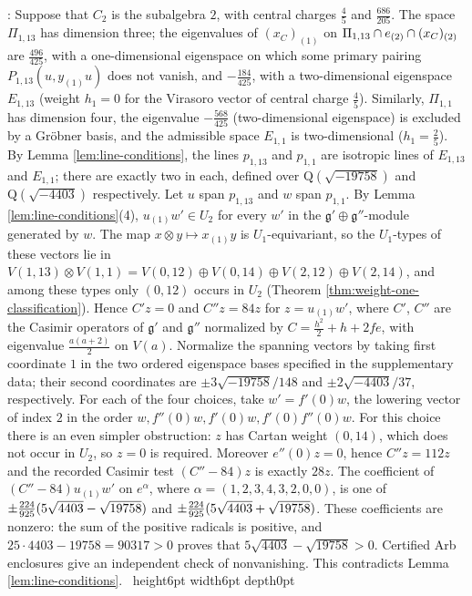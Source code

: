 \documentclass[leqno]{article}
\newcommand{\Q}{\mathrm{Q}}
\newcommand{\qed}{\hfill \vrule height6pt  width6pt depth0pt}
\newcommand{\ot}{\otimes}
\let\i\relax
\newcommand{\i}{\mathrm{i}}
\let\ker\relax
\DeclareMathOperator{\ker}{Ker}
\newenvironment{proof}[1][]{\noindent {\it Proof #1} : }{\hbox{~}\qed
\smallskip
}
\numberwithin{equation}{section}
\begin{document}
\begin{proof}
Suppose that $C_2$ is the subalgebra $2$, with central charges $\frac45$ and $\frac{686}{205}$. The space $\Pi_{1,13}$ has dimension three; the eigenvalues of $(x_C)_{(1)}$ on $\Pi_{1,13} \cap \ker e_{(2)} \cap \ker (x_C)_{(2)}$ are $\frac{496}{425}$, with a one-dimensional eigenspace on which some primary pairing $P_{1,13}(u,y_{(1)}u)$ does not vanish, and $-\frac{184}{425}$, with a two-dimensional eigenspace $E_{1,13}$ (weight $h_1 = 0$ for the Virasoro vector of central charge $\frac45$). Similarly, $\Pi_{1,1}$ has dimension four, the eigenvalue $-\frac{568}{425}$ (two-dimensional eigenspace) is excluded by a Gröbner basis, and the admissible space $E_{1,1}$ is two-dimensional ($h_1 = \frac25$). By Lemma \ref{lem:line-conditions}, the lines $p_{1,13}$ and $p_{1,1}$ are isotropic lines of $E_{1,13}$ and $E_{1,1}$; there are exactly two in each, defined over $\Q(\sqrt{-19758})$ and $\Q(\sqrt{-4403})$ respectively. Let $u$ span $p_{1,13}$ and $w$ span $p_{1,1}$. By Lemma \ref{lem:line-conditions}(4), $u_{(1)}w' \in U_2$ for every $w'$ in the $\mathfrak g' \oplus \mathfrak g''$-module generated by $w$. The map $x \ot y \mapsto x_{(1)}y$ is $U_1$-equivariant, so the $U_1$-types of these vectors lie in $V(1,13) \ot V(1,1) = V(0,12) \oplus V(0,14) \oplus V(2,12) \oplus V(2,14)$, and among these types only $(0,12)$ occurs in $U_2$ (Theorem \ref{thm:weight-one-classification}). Hence $C'z = 0$ and $C''z = 84z$ for $z = u_{(1)}w'$, where $C'$, $C''$ are the Casimir operators of $\mathfrak g'$ and $\mathfrak g''$ normalized by $C = \frac{h^2}2 + h + 2fe$, with eigenvalue $\frac{a(a+2)}2$ on $V(a)$. Normalize the spanning vectors by taking first coordinate $1$ in the two ordered eigenspace bases specified in the supplementary data; their second coordinates are $\pm 3\sqrt{-19758}/148$ and $\pm 2\sqrt{-4403}/37$, respectively. For each of the four choices, take $w' = f'(0)w$, the lowering vector of index $2$ in the order $w, f''(0)w, f'(0)w, f'(0)f''(0)w$. For this choice there is an even simpler obstruction: $z$ has Cartan weight $(0,14)$, which does not occur in $U_2$, so $z = 0$ is required. Moreover $e''(0)z = 0$, hence $C''z = 112z$ and the recorded Casimir test $(C''-84)z$ is exactly $28z$. The coefficient of $(C''-84)u_{(1)}w'$ on $e^\alpha$, where $\alpha = (1,2,3,4,3,2,0,0)$, is one of $\pm \frac{224\i}{925}(5\sqrt{4403}-\sqrt{19758})$ and $\pm \frac{224\i}{925}(5\sqrt{4403}+\sqrt{19758})$. These coefficients are nonzero: the sum of the positive radicals is positive, and $25\cdot 4403-19758 = 90317 > 0$ proves that $5\sqrt{4403}-\sqrt{19758} > 0$. Certified Arb enclosures give an independent check of nonvanishing. This contradicts Lemma \ref{lem:line-conditions}.
\end{proof}
\end{document}
